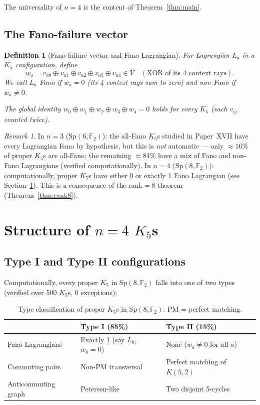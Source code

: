 \documentclass[11pt,a4paper]{article}
\newtheorem{definition}[theorem]{Definition}
\theoremstyle{remark}
\newtheorem{remark}[theorem]{Remark}
\newcommand{\Sp}{\mathrm{Sp}}
\begin{document}
\noindent
The universality of $n=4$ is the content of Theorem~\ref{thm:main}.

\subsection{The Fano-failure vector}

\begin{definition}[Fano-failure vector and Fano Lagrangian]
For Lagrangian $L_a$ in a $K_5$ configuration, define
\[
  w_a = v_{a0} \oplus v_{a1} \oplus v_{a2} \oplus v_{a3} \oplus v_{a4}
  \in V \quad (\text{XOR of its 4 context rays}).
\]
We call $L_a$ \emph{Fano} if $w_a = 0$ (its 4 context rays sum to zero)
and \emph{non-Fano} if $w_a \neq 0$.

The global identity $w_0 \oplus w_1 \oplus w_2 \oplus w_3 \oplus w_4 = 0$
holds for every $K_5$ (each $v_{ij}$ counted twice).
\end{definition}

\begin{remark}
In $n=3$ ($\Sp(6,\mathbb{F}_2)$): the all-Fano $K_5$s studied in Paper~XVII have
every Lagrangian Fano by hypothesis, but this is \emph{not} automatic --- only
$\approx 16\%$ of proper $K_5$s are all-Fano; the remaining $\approx 84\%$ have a
mix of Fano and non-Fano Lagrangians (verified computationally).
In $n=4$ ($\Sp(8,\mathbb{F}_2)$): computationally, proper $K_5$s have either
0 or exactly 1 Fano Lagrangian (see Section~\ref{sec:structure}).
This is a consequence of the rank$=8$ theorem (Theorem~\ref{thm:rank8}).
\end{remark}


\section{Structure of \texorpdfstring{$n=4$}{n=4}
         \texorpdfstring{$K_5$}{K5}s}\label{sec:structure}

\subsection{Type I and Type II configurations}

Computationally, every proper $K_5$ in $\Sp(8,\mathbb{F}_2)$ falls into one of
two types (verified over 500 $K_5$s, 0 exceptions):

\begin{table}[H]
\centering
\begin{tabular}{lll}
\toprule
& \textbf{Type I} (85\%) & \textbf{Type II} (15\%) \\
\midrule
Fano Lagrangians & Exactly 1 (say $L_0$, $w_0=0$) & None ($w_a \neq 0$ for all $a$) \\
Commuting pairs & Non-PM transversal & Perfect matching of $K(5,2)$ \\
Anticommuting graph & Petersen-like & Two disjoint 5-cycles \\
\bottomrule
\end{tabular}
\caption{Type classification of proper $K_5$s in $\Sp(8,\mathbb{F}_2)$.
PM = perfect matching.}
\label{tab:types}
\end{table}
\end{document}
